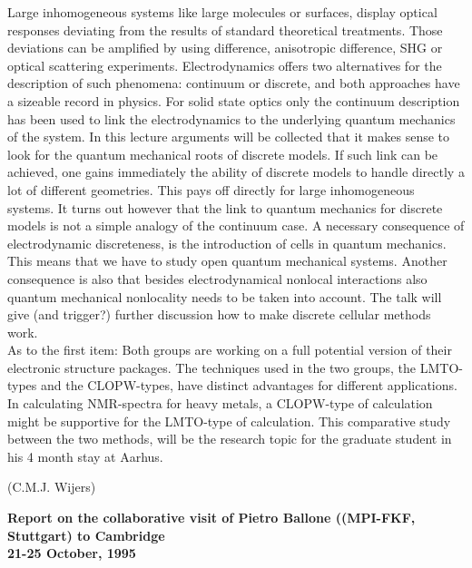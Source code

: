 {\noindent
Large inhomogeneous systems like large molecules or surfaces, display optical 
responses deviating from the results of standard theoretical treatments. Those 
deviations can be amplified by using difference, anisotropic difference, 
SHG or optical scattering experiments. Electrodynamics offers two alternatives 
for the description of such phenomena: continuum or discrete, and both 
approaches have a sizeable record in physics. For solid state optics only the 
continuum description has been used to link the electrodynamics to the 
underlying quantum mechanics of the system. In this lecture arguments will be 
collected that it makes sense to look for the quantum mechanical roots of 
discrete models. If such link can be achieved, one gains immediately the 
ability of discrete models to handle directly a lot of different geometries. 
This pays off directly for large inhomogeneous systems. It turns out however 
that the link to quantum mechanics for discrete models is not a simple analogy 
of the continuum case. A necessary consequence of electrodynamic discreteness, 
is the introduction of cells in quantum mechanics. This means that we have 
to study open quantum mechanical systems. Another consequence is also that 
besides electrodynamical nonlocal interactions also quantum mechanical 
nonlocality needs to be taken into account. The talk will give (and trigger?) 
further discussion how to make discrete cellular methods work.\\

\bigskip
\noindent
As to the first item: Both groups are working on a full potential version of 
their electronic structure packages. The techniques used in the two groups, 
the LMTO-types and the CLOPW-types, have distinct advantages for different 
applications. In calculating NMR-spectra for heavy metals, a CLOPW-type of 
calculation might be supportive for the LMTO-type of calculation. This 
comparative study between the two methods, will be the research topic for 
the graduate student in his 4 month stay at Aarhus.\\

\begin{flushright}
(C.M.J. Wijers)
\end{flushright}

\vspace{0.5cm}
\normalsize
\begin{center}
\Large{\bf Report on the collaborative visit of Pietro Ballone ((MPI-FKF, Stuttgart)
to Cambridge}\\
\large{\bf 21-25 October, 1995}\\
\end{center}

}
